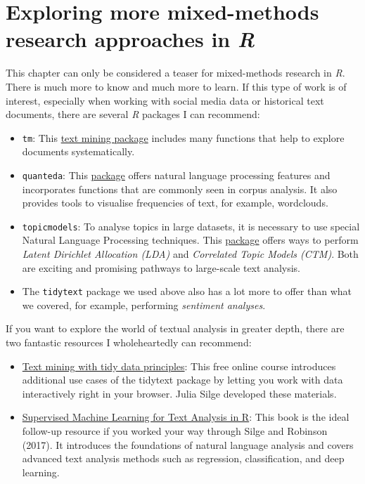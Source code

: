 \documentclass[
  letterpaper,
  DIV=11,
  numbers=noendperiod]{scrreprt}
\begin{document}
\section{\texorpdfstring{Exploring more mixed-methods research
approaches in
\emph{R}}{Exploring more mixed-methods research approaches in R}}\label{exploring-more-mixed-methods-research-approaches-in-r}

This chapter can only be considered a teaser for mixed-methods research
in \emph{R}. There is much more to know and much more to learn. If this
type of work is of interest, especially when working with social media
data or historical text documents, there are several \emph{R} packages I
can recommend:

\begin{itemize}
\item
  \texttt{tm}: This \href{http://tm.r-forge.r-project.org}{text mining
  package} includes many functions that help to explore documents
  systematically.
\item
  \texttt{quanteda}: This \href{https://quanteda.io}{package} offers
  natural language processing features and incorporates functions that
  are commonly seen in corpus analysis. It also provides tools to
  visualise frequencies of text, for example, wordclouds.
\item
  \texttt{topicmodels}: To analyse topics in large datasets, it is
  necessary to use special Natural Language Processing techniques. This
  \href{https://cran.r-project.org/web/packages/topicmodels/index.html}{package}
  offers ways to perform \emph{Latent Dirichlet Allocation (LDA)} and
  \emph{Correlated Topic Models (CTM)}. Both are exciting and promising
  pathways to large-scale text analysis.
\item
  The \texttt{tidytext} package we used above also has a lot more to
  offer than what we covered, for example, performing \emph{sentiment
  analyses}.
\end{itemize}

If you want to explore the world of textual analysis in greater depth,
there are two fantastic resources I wholeheartedly can recommend:

\begin{itemize}
\item
  \href{https://juliasilge.shinyapps.io/learntidytext/}{Text mining with
  tidy data principles}: This free online course introduces additional
  use cases of the tidytext package by letting you work with data
  interactively right in your browser. Julia Silge developed these
  materials.
\item
  \href{https://smltar.com}{Supervised Machine Learning for Text
  Analysis in R}: This book is the ideal follow-up resource if you
  worked your way through Silge and Robinson (2017). It introduces the
  foundations of natural language analysis and covers advanced text
  analysis methods such as regression, classification, and deep
  learning.
\end{itemize}
\end{document}
